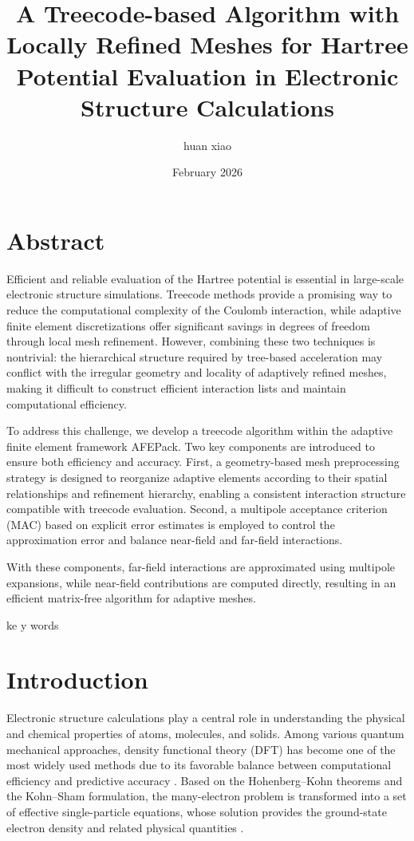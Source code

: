 \documentclass[a4paper,10pt]{article}
\begin{document}
\linenumbers
\title{A Treecode-based Algorithm with Locally Refined Meshes for
Hartree Potential Evaluation in Electronic Structure
Calculations}
\author{huan xiao}
\date{February 2026}


\maketitle

\tableofcontents


\section*{Abstract}

Efficient and reliable evaluation of the Hartree potential is essential in large-scale electronic structure simulations. Treecode methods provide a promising way to reduce the computational complexity of the Coulomb interaction, while adaptive finite element discretizations offer significant savings in degrees of freedom through local mesh refinement. However, combining these two techniques is nontrivial: the hierarchical structure required by tree-based acceleration may conflict with the irregular geometry and locality of adaptively refined meshes, making it difficult to construct efficient interaction lists and maintain computational efficiency.

To address this challenge, we develop a treecode algorithm within the adaptive finite element framework AFEPack. Two key components are introduced to ensure both efficiency and accuracy. First, a geometry-based mesh preprocessing strategy is designed to reorganize adaptive elements according to their spatial relationships and refinement hierarchy, enabling a consistent interaction structure compatible with treecode evaluation. Second, a multipole acceptance criterion (MAC) based on explicit error estimates is employed to control the approximation error and balance near-field and far-field interactions.

With these components, far-field interactions are approximated using multipole
expansions, while near-field contributions are computed directly, resulting in
an efficient matrix-free algorithm for adaptive meshes.

ke y words
\section{Introduction}

Electronic structure calculations play a central role in understanding the physical and chemical properties of atoms, molecules, and solids. Among various quantum mechanical approaches, density functional theory (DFT) has become one of the most widely used methods due to its favorable balance between computational efficiency and predictive accuracy
\cite{Hohenberg1964,Kohn1965,Parr1989,Martin2004,Jones2015}.
Based on the Hohenberg--Kohn theorems and the Kohn--Sham formulation, the many-electron problem is transformed into a set of effective single-particle equations, whose solution provides the ground-state electron density and related physical quantities
\cite{Hohenberg1964,Kohn1965}.
\end{document}
